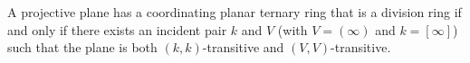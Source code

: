 A projective plane has a coordinating planar ternary ring that is a division ring if and only if there exists an incident pair $k$ and $V$ (with $V = (\infty)$ and $k = [\infty]$) such that the plane is both $(k,k)$-transitive and $(V,V)$-transitive.

